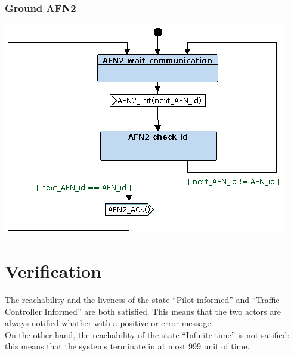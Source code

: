 \documentclass{article}
\begin{document}
\subsubsection{Ground AFN2}
\includegraphics[width=\textwidth]{./lab2_09.png}

\section{Verification}
The reachability and the liveness of the state ``Pilot informed'' and ``Traffic Controller Informed'' are both satisfied. This means that the two actors are always notified whather with a positive or error message. \\
On the other hand, the reachability of the state ``Infinite time'' is not satified: this means that the systems terminate in at most 999 unit of time.  
\end{document}

